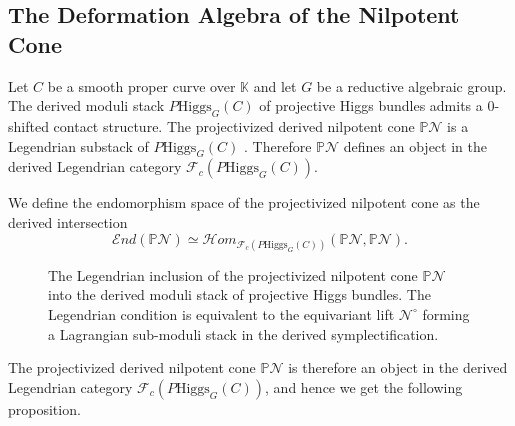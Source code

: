 \documentclass[reqno]{amsart}
\newcommand{\Gm}{\mathbb{G}_m}
\newcommand{\K}{\mathbb{K}}
\begin{document}
\subsection{The Deformation Algebra of the Nilpotent Cone}
Let $C$ be a smooth proper curve over $\K$ and let $G$ be a reductive algebraic group. The derived moduli stack $P\mathrm{Higgs}_G(C)$ of projective Higgs bundles admits a $0$-shifted contact structure. The projectivized derived nilpotent cone $\mathbb{P}\mathcal{N}$ is a Legendrian substack of $P\mathrm{Higgs}_G(C)$ \cite[Theorem 4.1]{IzbudakBerktav}. Therefore $\mathbb{P}\mathcal{N}$ defines an object in the derived Legendrian category $\mathcal{F}_{c}(P\mathrm{Higgs}_G(C))$.

We define the endomorphism space of the projectivized nilpotent cone as the derived intersection
\[
\mathcal{E}nd(\mathbb{P}\mathcal{N}) \simeq \mathcal{H}om_{\mathcal{F}_{c}(P\mathrm{Higgs}_G(C))}(\mathbb{P}\mathcal{N}, \mathbb{P}\mathcal{N}).
\]
\begin{figure}[htbp]
    \centering
    \caption{\small The Legendrian inclusion of the projectivized nilpotent cone $\mathbb{P}\mathcal{N}$ into the derived moduli stack of projective Higgs bundles. The Legendrian condition is equivalent to the equivariant lift $\mathcal{N}^\circ$ forming a Lagrangian sub-moduli stack in the derived symplectification.}
\end{figure}
The projectivized derived nilpotent cone $\mathbb{P}\mathcal{N}$ is therefore an object in the derived Legendrian category $\mathcal{F}_{c}(P\mathrm{Higgs}_G(C))$, and hence we get the following proposition. %
\end{document}
